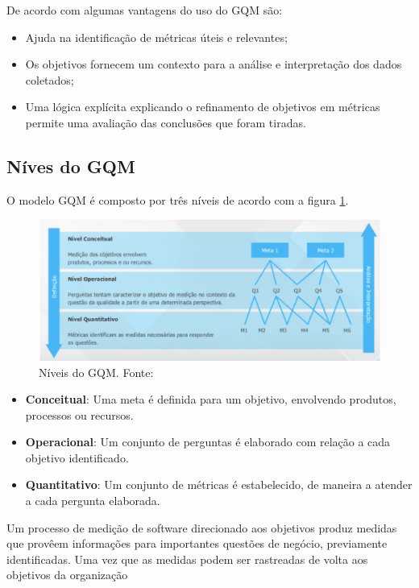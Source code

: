 De acordo com \cite{differding} algumas vantagens do uso do GQM são:

\begin{itemize}
  \item Ajuda na identificação de métricas úteis e relevantes;
  \item Os objetivos fornecem um contexto para a análise e interpretação dos dados coletados;
  \item Uma lógica explícita explicando o refinamento de objetivos em métricas permite uma avaliação das conclusões que foram tiradas.
\end{itemize}

\subsection{Níves do GQM}

O modelo GQM é composto por três níveis de acordo com a figura \ref{fig:gqm1}.

\begin{figure}[h!]
	\centering
  \includegraphics[keepaspectratio=true,scale=0.5]{figuras/gqm.eps}
  \caption[Níveis do GQM.]{Níveis do GQM. Fonte: \cite{junior}}
	\label{fig:gqm1}
\end{figure}

\begin{itemize}
  \item \textbf{Conceitual}: Uma meta é definida para um objetivo, envolvendo produtos, processos ou recursos.
  \item \textbf{Operacional}: Um conjunto de perguntas é elaborado com relação a cada objetivo identificado.
  \item \textbf{Quantitativo}: Um conjunto de métricas é estabelecido, de maneira a atender a cada pergunta elaborada.
\end{itemize}

Um processo de medição de software direcionado aos objetivos produz medidas que provêem informações para importantes questões de negócio, previamente identificadas. Uma vez que as medidas podem ser rastreadas de volta aos objetivos da organização \cite{junior}
